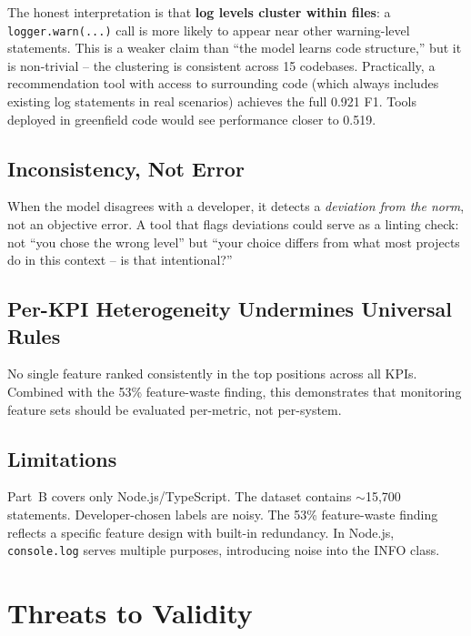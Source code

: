 \documentclass[10pt,twocolumn]{article}
\begin{document}
The honest interpretation is that \textbf{log levels cluster within files}: a \texttt{logger.warn(...)} call is more likely to appear near other warning-level statements. This is a weaker claim than ``the model learns code structure,'' but it is non-trivial -- the clustering is consistent across 15 codebases. Practically, a recommendation tool with access to surrounding code (which always includes existing log statements in real scenarios) achieves the full 0.921 F1. Tools deployed in greenfield code would see performance closer to 0.519.

\subsection{Inconsistency, Not Error}

When the model disagrees with a developer, it detects a \emph{deviation from the norm}, not an objective error. A tool that flags deviations could serve as a linting check: not ``you chose the wrong level'' but ``your choice differs from what most projects do in this context -- is that intentional?''

\subsection{Per-KPI Heterogeneity Undermines Universal Rules}

No single feature ranked consistently in the top positions across all KPIs. Combined with the 53\% feature-waste finding, this demonstrates that monitoring feature sets should be evaluated per-metric, not per-system.

\subsection{Limitations}

Part~B covers only Node.js/TypeScript. The dataset contains $\sim$15,700 statements. Developer-chosen labels are noisy. The 53\% feature-waste finding reflects a specific feature design with built-in redundancy. In Node.js, \texttt{console.log} serves multiple purposes, introducing noise into the INFO class.

\section{Threats to Validity}
\label{sec:threats}
\end{document}
